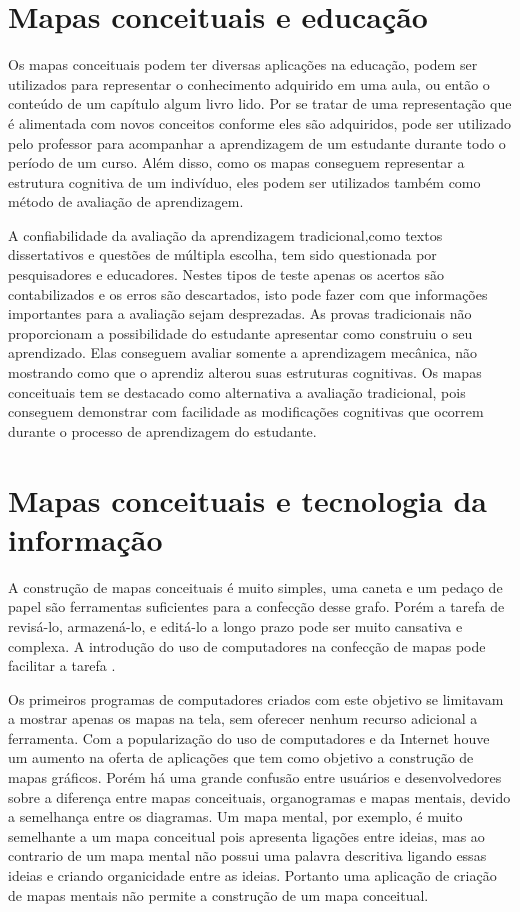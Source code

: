 \documentclass[
	12pt,				%
	openright,			%
	oneside,			%
	a4paper,			%
	english,			%
	french,				%
	spanish,			%
	brazil				%
	]{abntex2}
\begin{document}
\section{Mapas conceituais e educação}\label{sec-mapeduc}

Os mapas conceituais podem ter diversas aplicações na educação, podem ser utilizados para representar o conhecimento adquirido em uma aula, ou então o conteúdo de um capítulo algum livro lido. Por se tratar de uma representação que é alimentada com novos conceitos conforme eles são adquiridos, pode ser utilizado pelo professor para acompanhar a aprendizagem de um estudante durante todo o período de um curso. Além disso, como os mapas conseguem representar a estrutura cognitiva de um indivíduo, eles podem ser utilizados também como método de avaliação de aprendizagem\cite{Perin2014}.

A confiabilidade da avaliação da aprendizagem tradicional,como textos dissertativos e questões de múltipla escolha, tem sido questionada por pesquisadores e educadores. Nestes tipos de teste apenas os acertos são contabilizados e os erros são descartados, isto pode fazer com que informações importantes para a avaliação sejam desprezadas.
As provas tradicionais não proporcionam a possibilidade do estudante apresentar como construiu o seu aprendizado. Elas conseguem avaliar somente a aprendizagem mecânica, não mostrando como que o aprendiz alterou suas estruturas cognitivas.
Os mapas conceituais tem se destacado como alternativa a avaliação tradicional, pois conseguem demonstrar com facilidade as modificações cognitivas que ocorrem durante o processo de aprendizagem do estudante\cite{Dutra2002}.

\section{Mapas conceituais e tecnologia da informação}

A construção de mapas conceituais é muito simples, uma caneta e um pedaço de papel são ferramentas suficientes para a confecção desse grafo. Porém a tarefa de revisá-lo, armazená-lo, e editá-lo a longo prazo  pode ser muito cansativa e complexa. A introdução do uso de computadores na confecção de mapas pode facilitar a tarefa \cite{Novak2006}.

Os primeiros programas de computadores criados com este objetivo se limitavam a mostrar apenas os mapas na tela, sem oferecer nenhum recurso adicional a ferramenta. Com a popularização do uso de computadores e da Internet houve um aumento na oferta de aplicações que tem como objetivo a construção de mapas gráficos. Porém há uma grande confusão entre usuários e desenvolvedores sobre a diferença entre mapas conceituais, organogramas e mapas mentais, devido a semelhança entre os diagramas\cite{Perin2014}. Um mapa mental, por exemplo, é muito semelhante a um mapa conceitual pois apresenta ligações entre ideias, mas ao contrario de um mapa mental não possui uma palavra descritiva ligando essas ideias e criando organicidade entre as ideias. Portanto uma aplicação de criação de mapas mentais não permite a construção de um mapa conceitual. 
\end{document}
